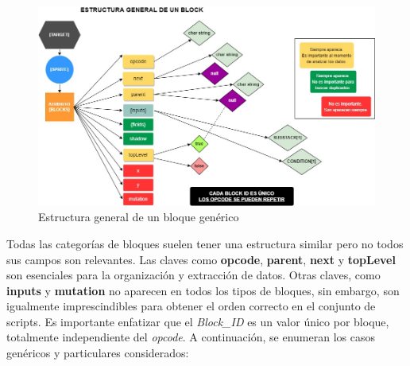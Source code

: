 \documentclass[a4paper, 12pt]{book}
\begin{document}
\begin{figure}[!htb]
  \centering
  \includegraphics[width=17cm, keepaspectratio]{img/block_general.jpg}
  \caption{Estructura general de un bloque genérico}
  \label{fig:graljson}
\end{figure}


Todas las categorías de bloques suelen tener una estructura similar pero no todos sus campos son relevantes. Las claves como \textbf{opcode}, \textbf{parent}, \textbf{next} y \textbf{topLevel} son esenciales para la organización y extracción de datos. Otras claves, como \textbf{inputs} y \textbf{mutation} no aparecen en todos los tipos de bloques, sin embargo, son igualmente imprescindibles para obtener el orden correcto en el conjunto de scripts. Es importante enfatizar que el \textit{Block\_ID} es un valor único por bloque, totalmente independiente del \textit{opcode}. A continuación, se enumeran los casos genéricos y particulares considerados:
\end{document}

